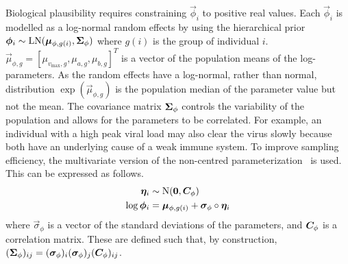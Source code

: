 \documentclass[thesis.tex]{subfiles}
\begin{document}
Biological plausibility requires constraining $\vec{\phi}_i$ to positive real values.
Each $\vec{\phi}_i$ is modelled as a log-normal random effects by using the hierarchical prior $\bm{\phi}_i \sim \operatorname{LN}(\bm{\mu}_{\phi,g(i)}, \bm{\Sigma}_\phi)$ where $g(i)$ is the group of individual $i$.
$\vec{\mu}_{\phi,g} = [\mu_{v_{\max},g}, \mu_{a,g}, \mu_{b,g}]^T$ is a vector of the population means of the log-parameters.
As the random effects have a log-normal, rather than normal, distribution $\exp(\vec{\mu}_{\phi,g})$ is the population median of the parameter value but not the mean.
The covariance matrix $\bm{\Sigma}_\phi$ controls the variability of the population and allows for the parameters to be correlated.
For example, an individual with a high peak viral load may also clear the virus slowly because both have an underlying cause of a weak immune system.
To improve sampling efficiency, the multivariate version of the non-centred parameterization~\autocite{papaspiliopoulosGeneral,stanReparameterization} is used.
This can be expressed as follows.
\begin{align}
  \bm{\eta}_i &\sim \operatorname{N}(\bm{0}, \bm{C}_\phi) \\
  \log \bm{\phi}_i &= \bm{\mu}_{\phi,g(i)} + \bm{\sigma}_\phi \circ \bm{\eta}_i
\end{align}
where $\vec{\sigma}_\phi$ is a vector of the standard deviations of the parameters, and $\bm{C}_\phi$ is a correlation matrix.
These are defined such that, by construction, $(\bm{\Sigma}_\phi)_{ij} = (\bm{\sigma}_\phi)_i (\bm{\sigma}_\phi)_j (\bm{C}_\phi)_{ij}$.
\end{document}

